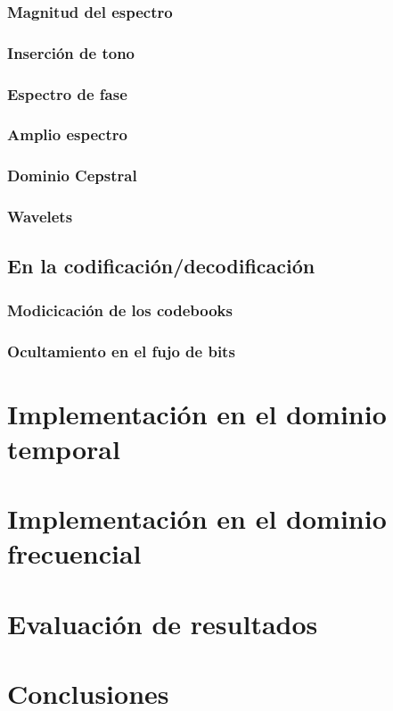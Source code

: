 \documentclass[conference,a4paper,10pt, oneside,final]{tfmpd}
\begin{document}
\subsubsection{Magnitud del espectro}
\subsubsection{Inserción de tono}
\subsubsection{Espectro de fase}
\subsubsection{Amplio espectro}
\subsubsection{Dominio Cepstral}
\subsubsection{Wavelets}

\subsection{En la codificación/decodificación}
\subsubsection{Modicicación de los codebooks}
\subsubsection{Ocultamiento en el fujo de bits}

\section{Implementación en el dominio temporal}
\section{Implementación en el dominio frecuencial}
\section{Evaluación de resultados}
\section{Conclusiones}

\nocite{*}


\end{document}

